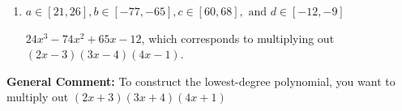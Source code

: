\documentclass{extbook}[14pt]
\begin{document}
\begin{enumerate}
{\begin{enumerate}[label=\Alph*.]
$24x^{3} +74 x^{2} +65 x -12$, which corresponds to multiplying everything correctly except the constant term.
\item \( a \in [21, 26], b \in [-77, -65], c \in [60, 68], \text{ and } d \in [-12, -9] \)

$24x^{3} -74 x^{2} +65 x -12$, which corresponds to multiplying out $(2x -3)(3x -4)(4x -1)$.
\end{enumerate}

\textbf{General Comment:} To construct the lowest-degree polynomial, you want to multiply out $(2x + 3)(3x + 4)(4x + 1)$
}
\end{enumerate}
\end{document}

